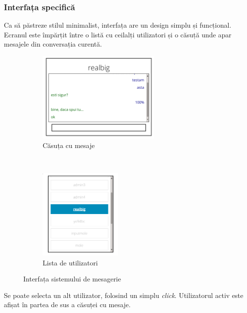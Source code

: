 \documentclass[12pt,a4paper]{article}
\begin{document}
\subsubsection{Interfața specifică}
Ca să păstreze stilul minimalist, interfața are un design simplu și funcțional. 
Ecranul este împărțit între o listă cu ceilalți utilizatori și o căsuță unde apar mesajele
din conversația curentă. 

\begin{figure}[h!]
        \centering
        \begin{subfigure}[b]{0.45\textwidth}
                \includegraphics[height=4.5cm]{img/zona.png}
                \caption{Căsuța cu mesaje}
        \end{subfigure}%
        ~ \qquad 
        \begin{subfigure}[b]{0.35\textwidth}
                \includegraphics[height=4.5cm]{img/lista.png}
                \caption{Lista de utilizatori}
        \end{subfigure}
        \vspace{-7px}
        \caption{Interfața sistemului de mesagerie}%
\end{figure}

Se poate selecta un alt utilizator, folosind un simplu \textit{click}. Utilizatorul activ este afișat în partea de sus a căsuței cu mesaje. 
\end{document}
